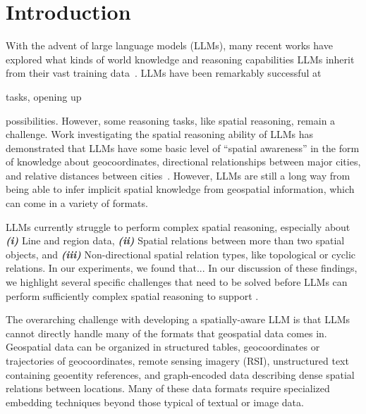 \section{Introduction}

\label{section:introduction}

With the advent of large language models (LLMs), many recent works have explored what kinds of world knowledge and reasoning capabilities LLMs inherit from their vast training data~\cite{Mai2023, Bhandari2023, Qi2023}.
%
LLMs have been remarkably successful at 

tasks, opening up 

possibilities.
%
However, some reasoning tasks, like spatial reasoning, remain a challenge.
%
%
Work investigating the spatial reasoning ability of LLMs has demonstrated that LLMs have some basic level of ``spatial awareness'' in the form of knowledge about geocoordinates, directional relationships between major cities, and relative distances between cities~\cite{Bhandari2023, Qi2023}.
However, LLMs are still a long way from being able to infer implicit spatial knowledge from geospatial information, which can come in a variety of formats.


LLMs currently struggle to perform complex spatial reasoning, especially about
%
\textit{\textbf{(i)}} Line and region data,
\textit{\textbf{(ii)}} Spatial relations between more than two spatial objects, and 
\textit{\textbf{(iii)}} Non-directional spatial relation types, like topological or cyclic relations.
%
In our experiments, we found that... 
%
In our discussion of these findings, we highlight several specific challenges that need to be solved before LLMs can perform sufficiently complex spatial reasoning to support .


The overarching challenge with developing a spatially-aware LLM is that LLMs cannot directly handle many of the formats that geospatial data comes in.
Geospatial data can be organized in structured tables, geocoordinates or trajectories of geocoordinates, remote sensing imagery (RSI), unstructured text containing geoentity references, and graph-encoded data describing dense spatial relations between locations.
%
Many of these data formats require specialized embedding techniques beyond those typical of textual or image data.


